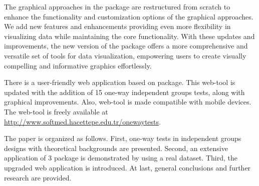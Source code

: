 The graphical approaches in the package are restructured from scratch to enhance the functionality and customization options of the graphical approaches. We add new features and enhancements providing even more flexibility in visualizing data while maintaining the core functionality. With these updates and improvements, the new version of the package offers a more comprehensive and versatile set of tools for data visualization, empowering users to create visually compelling and informative graphics effortlessly.

There is a user-friendly web application based on  package. This web-tool is updated with the addition of 15 one-way independent groups tests, along with graphical improvements. Also, web-tool is made compatible with mobile devices. The web-tool is freely available at \href{url}{http://www.softmed.hacettepe.edu.tr/onewaytests}.

The paper is organized as follows. First, one-way tests in independent groups designs with theoretical backgrounds are presented. Second, an extensive application of  3 package is demonstrated by using a real dataset. Third, the upgraded web application is introduced. At last, general conclusions and further research are provided. 


